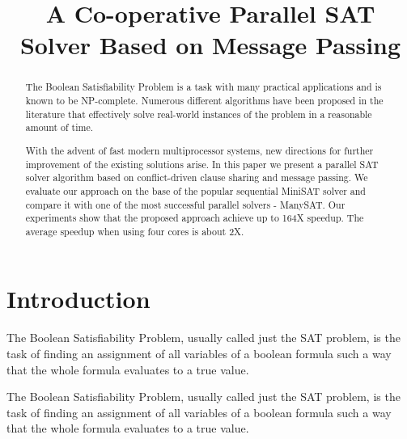 \documentclass[letterpaper, compsoc, conference]{IEEEtran}
\begin{document}
\title{A Co-operative Parallel SAT Solver Based on Message Passing}

\author{
    \and {}
}
\maketitle

\begin{abstract}
The Boolean Satisfiability Problem is a task with many practical applications
and is known to be NP-complete. Numerous different algorithms have been
proposed in the literature that effectively solve real-world instances of the
problem in a reasonable amount of time. 

With the advent of fast modern multiprocessor systems, new directions for
further improvement of the existing solutions arise. In this paper we present a
parallel SAT solver algorithm based on conflict-driven clause sharing and
message passing. We evaluate our approach on the base of the popular sequential
MiniSAT solver and compare it with one of the most successful parallel solvers
- ManySAT. Our experiments show that the proposed approach achieve up to 164X
speedup. The average speedup when using four cores is about 2X.

\end{abstract}

\section{Introduction}
The Boolean Satisfiability Problem, usually called just the SAT problem, 
is the task of finding an assignment of all variables of a boolean 
formula such a way that the whole formula evaluates to a true value.

The Boolean Satisfiability Problem, usually called just the SAT problem, is the
task of finding an assignment of all variables of a boolean formula such a way
that the whole formula evaluates to a true value.
\end{document}
